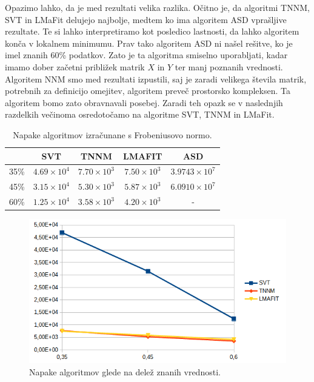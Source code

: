 Opazimo lahko, da je med rezultati velika razlika. Očitno je, da algoritmi TNNM, SVT in LMaFit delujejo najbolje, medtem ko ima algoritem ASD vprašljive rezultate. Te si lahko interpretiramo kot posledico lastnosti, da lahko algoritem konča v lokalnem minimumu. Prav tako algoritem ASD ni našel rešitve, ko je imel znanih 60\% podatkov. Zato je ta algoritma smiselno uporabljati, kadar imamo dober začetni približek matrik $X$ in $Y$ ter manj poznanih vrednosti.
Algoritem NNM smo med rezultati izpustili, saj je zaradi velikega števila matrik, potrebnih za definicijo omejitev, algoritem preveč prostorsko kompleksen. Ta algoritem bomo zato obravnavali posebej. Zaradi teh opazk se v naslednjih razdelkih večinoma osredotočamo na algoritme SVT, TNNM in LMaFit.
\begin{table}[h]
    \centering
    \begin{tabular}{|c|c|c|c|c|}
        \hline
             & SVT                & TNNM               & LMAFIT             & ASD                  \\ \hline
        35\% & $4.69 \times 10^4$ & $7.70 \times 10^3$ & $7.50 \times 10^3$ & $3.9743 \times 10^7$ \\ \hline
        45\% & $3.15 \times 10^4$ & $5.30 \times 10^3$ & $5.87 \times 10^3$ & $6.0910 \times 10^7$ \\ \hline
        60\% & $1.25 \times 10^4$ & $3.58 \times 10^3$ & $4.20 \times 10^3$ & -                    \\ \hline
    \end{tabular}
    \caption{Napake algoritmov izračunane s Frobeniusovo normo.}
\end{table}
\begin{figure}[!ht]
    \centering
    \includegraphics[width=\linewidth]{Poglavja/Slike/grayscale1000/grafNapake.png}
    \caption{Napake algoritmov glede na delež znanih vrednosti.}
\end{figure}


